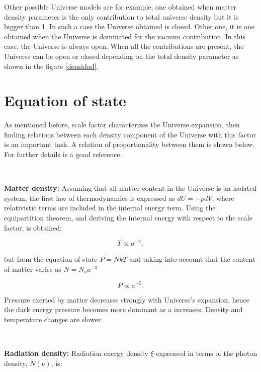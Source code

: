 Other possible Universe models are for example, one obtained when matter
density parameter is the only contribution to total universe density but 
it is bigger than 1. In such a case the Universe obtained is closed. 
Other one, it is one obtained when the Universe is dominated for the vacuum
contribution. In this case, the Universe is always open. When all the 
contributions are present, the Universe can be open or closed depending on the
total density parameter as shown in the figure \ref{densidad}. 
		
\section{ Equation of state }

As mentioned before, scale factor characterizes the Universe expansion, 
then finding relations between each density component of the Universe 
with this factor is an important task. A relation of proportionality 
between them is shown below. For further details \cite{padma} is a good reference. 

\

\textbf{Matter density:} Assuming that all matter content in the Universe is an 
isolated system, the first law of thermodynamics is expressed as $dU = -pdV$, 
where relativistic terms are included in the internal energy term. 
Using the equipartition theorem, and deriving the internal energy with respect to 
the scale factor, is obtained:

\[ T \propto a^{-2}, \]

but from the equation of state $P = NkT$ and taking into account that the content of 
matter varies as $N = N_oa^{-3}$ \cite{Longair}

\begin{equation}
P \propto a^{-5}.
\end{equation}


Pressure exerted by matter decreases strongly with Universe's expansion, 
hence the dark energy pressure becomes more dominant as a increases. 
Density and temperature changes are slower. 

\

\textbf{Radiation density:} Radiation energy density $\xi$ expressed in terms of the 
photon density, $N(\nu)$, is:


